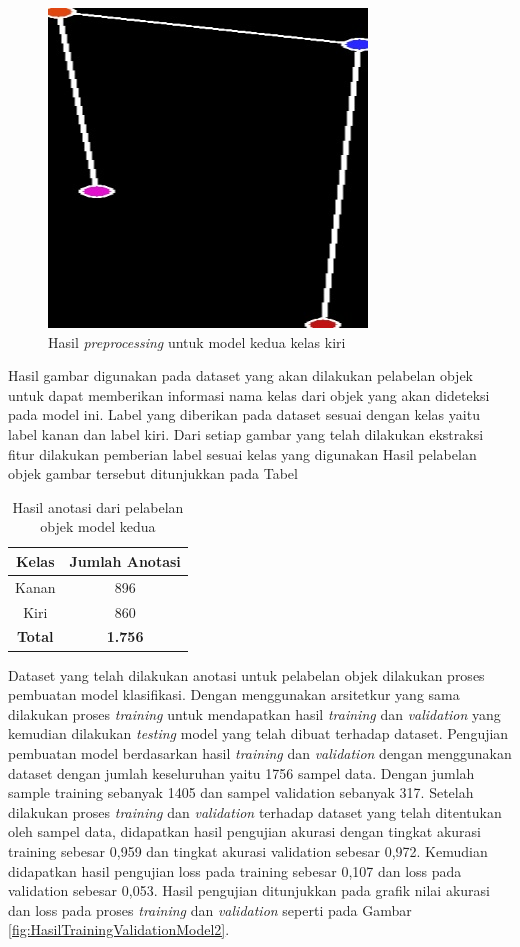 \begin{figure}[H]
  \centering
  \includegraphics[scale=0.45]{gambar/dataset belakang kiri.jpg}
  \caption{Hasil \emph{preprocessing} untuk model kedua kelas kiri}
  \label{fig:KelasBelakangKiri}
\end{figure}

Hasil gambar digunakan pada dataset yang akan dilakukan pelabelan objek untuk dapat memberikan informasi nama kelas dari objek yang akan dideteksi pada model ini. Label yang diberikan pada dataset sesuai dengan kelas yaitu label kanan dan label kiri. Dari setiap gambar yang telah dilakukan ekstraksi fitur dilakukan pemberian label sesuai kelas yang digunakan Hasil pelabelan objek gambar tersebut ditunjukkan pada Tabel 
\noindent
\begin{longtable}{|c|c|}
  \caption{Hasil anotasi dari pelabelan objek model kedua}
  \label{tb:HasilAnotasi}  \\
  \hline
  \rowcolor[HTML]{C0C0C0}
  \textbf{Kelas} & \textbf{Jumlah Anotasi}  \\
  \hline
  Kanan           & 896    \\
  \hline
  Kiri            & 860    \\
  \hline
  \textbf{Total}  & \textbf{1.756}  \\
  \hline
\end{longtable}

Dataset yang telah dilakukan anotasi untuk pelabelan objek dilakukan proses pembuatan model klasifikasi. Dengan menggunakan arsitetkur yang sama dilakukan proses \emph{training} untuk mendapatkan hasil \emph{training} dan \emph{validation} yang kemudian dilakukan \emph{testing} model yang telah dibuat terhadap dataset. Pengujian pembuatan model berdasarkan hasil \emph{training} dan \emph{validation} dengan menggunakan dataset dengan jumlah keseluruhan yaitu 1756 sampel data. Dengan jumlah sample training sebanyak 1405 dan sampel validation sebanyak 317. Setelah dilakukan proses \emph{training} dan \emph{validation} terhadap dataset yang telah ditentukan oleh sampel data, didapatkan hasil pengujian akurasi dengan tingkat akurasi training sebesar 0,959 dan tingkat akurasi validation sebesar 0,972. Kemudian didapatkan hasil pengujian loss pada training sebesar 0,107 dan loss pada validation sebesar 0,053. Hasil pengujian ditunjukkan pada grafik nilai akurasi dan loss pada proses \emph{training} dan \emph{validation} seperti pada Gambar \ref{fig:HasilTrainingValidationModel2}.

